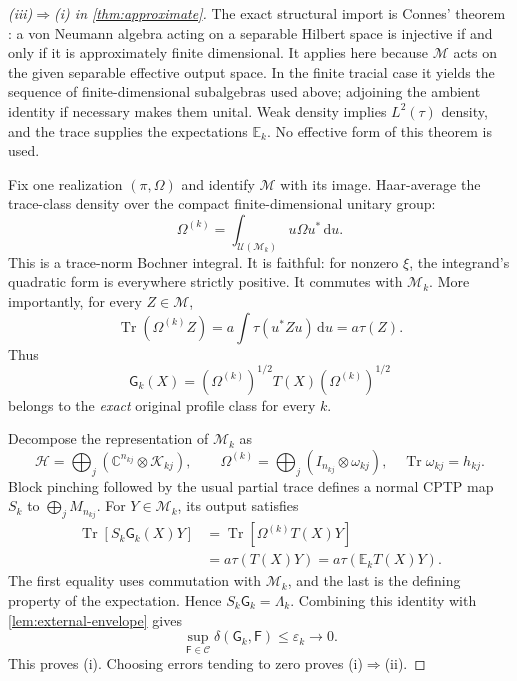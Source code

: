 \documentclass[11pt,reqno]{amsart}
\theoremstyle{definition}
\theoremstyle{remark}
\numberwithin{equation}{section}
\DeclareMathOperator{\Tr}{Tr}
\newcommand{\M}{\mathcal M}
\newcommand{\C}{\mathcal C}
\newcommand{\HH}{\mathcal H}
\newcommand{\F}{\mathsf F}
\newcommand{\G}{\mathsf G}
\newcommand{\dd}{\mathrm d}
\newcommand{\defic}{\delta}
\begin{document}
\begin{proof}[\textup{(iii)}$\Rightarrow$\textup{(i)} in \cref{thm:approximate}]
The exact structural import is Connes' theorem \cite[Chapter~V, \S7, Theorem~6]{Connes}: a von Neumann algebra acting on a separable Hilbert space is injective if and only if it is approximately finite dimensional. It applies here because $\M$ acts on the given separable effective output space. In the finite tracial case it yields the sequence of finite-dimensional subalgebras used above; adjoining the ambient identity if necessary makes them unital. Weak density implies $L^2(\tau)$ density, and the trace supplies the expectations $\mathbb E_k$. No effective form of this theorem is used.

Fix one realization $(\pi,\Omega)$ and identify $\M$ with its image. Haar-average the trace-class density over the compact finite-dimensional unitary group:
\begin{equation}\label{eq:Haar-density}
 \Omega^{(k)}=\int_{\mathcal U(\M_k)}u\Omega u^*\,\dd u.
\end{equation}
This is a trace-norm Bochner integral. It is faithful: for nonzero $\xi$, the integrand's quadratic form is everywhere strictly positive. It commutes with $\M_k$. More importantly, for every $Z\in\M$,
\[
 \Tr(\Omega^{(k)}Z)
 =a\int\tau(u^*Zu)\,\dd u=a\tau(Z).
\]
Thus
\begin{equation}\label{eq:inside-source}
 \G_k(X)=(\Omega^{(k)})^{1/2}T(X)(\Omega^{(k)})^{1/2}
\end{equation}
belongs to the \emph{exact} original profile class for every $k$.

Decompose the representation of $\M_k$ as
\[
 \HH=\bigoplus_j(\mathbb C^{n_{kj}}\otimes\mathcal K_{kj}),\qquad
 \Omega^{(k)}=\bigoplus_j(I_{n_{kj}}\otimes\omega_{kj}),
 \quad\Tr\omega_{kj}=h_{kj}.
\]
Block pinching followed by the usual partial trace defines a normal CPTP map $S_k$ to $\bigoplus_jM_{n_{kj}}$. For $Y\in\M_k$, its output satisfies
\begin{align*}
 \Tr[S_k\G_k(X)Y]
 &=\Tr[\Omega^{(k)}T(X)Y]\\
 &=a\tau(T(X)Y)=a\tau(\mathbb E_kT(X)Y).
\end{align*}
The first equality uses commutation with $\M_k$, and the last is the defining property of the expectation. Hence $S_k\G_k=\Lambda_k$. Combining this identity with \cref{lem:external-envelope} gives
\[
 \sup_{\F\in\C}\defic(\G_k,\F)\le\varepsilon_k\longrightarrow0.
\]
This proves \textup{(i)}. Choosing errors tending to zero proves \textup{(i)}$\Rightarrow$\textup{(ii)}.
\end{proof}
\end{document}
